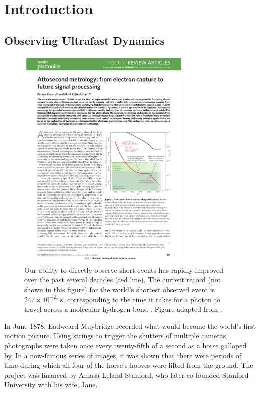 \chapter{Introduction}
\label{chap:intro}

\section{Observing Ultrafast Dynamics}

\begin{figure}
	\centering
	\includegraphics[width=0.75\textwidth]{figures/chap1/laser_pulse_vs_year.pdf}
	\caption{Our ability to directly observe short events has rapidly improved over the past several decades (red line). The current record (not shown in this figure) for the world's shortest observed event is $247 \times 10^{-21} \ \textrm{s}$, corresponding to the time it takes for a photon to travel across a molecular hydrogen bond \cite{grundmannZeptosecondBirthTime2020}. Figure adapted from \cite{krauszAttosecondMetrologyElectron2014}.}
	\label{fig:laser_pulse_vs_year}
\end{figure}

In June 1878, Eadweard Muybridge recorded what would become the world's first motion picture. Using strings to trigger the shutters of multiple cameras, photographs were taken once every twenty-fifth of a second as a horse galloped by. In a now-famous series of images, it was shown that there were periods of time during which all four of the horse's hooves were lifted from the ground. The project was financed by Amasa Leland Stanford, who later co-founded Stanford University with his wife, Jane.

